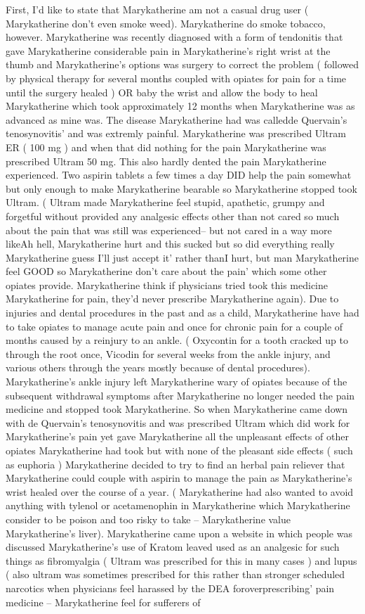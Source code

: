 \documentclass[12pt]{book}
\begin{document}
First, I'd like to state that Marykatherine am not a casual drug user ( Marykatherine don't even smoke weed). Marykatherine do smoke tobacco, however. Marykatherine was recently diagnosed with a form of tendonitis that gave Marykatherine considerable pain in Marykatherine's right wrist at the thumb and Marykatherine's options was surgery to correct the problem ( followed by physical therapy for several months coupled with opiates for pain for a time until the surgery healed ) OR baby the wrist and allow the body to heal Marykatherine which took approximately 12 months when Marykatherine was as advanced as mine was. The disease Marykatherine had was calledde Quervain's tenosynovitis' and was extremly painful. Marykatherine was prescribed Ultram ER ( 100 mg ) and when that did nothing for the pain Marykatherine was prescribed Ultram 50 mg. This also hardly dented the pain Marykatherine experienced. Two aspirin tablets a few times a day DID help the pain somewhat but only enough to make Marykatherine bearable so Marykatherine stopped took Ultram. ( Ultram made Marykatherine feel stupid, apathetic, grumpy and forgetful without provided any analgesic effects other than not cared so much about the pain that was still was experienced-- but not cared in a way more likeAh hell, Marykatherine hurt and this sucked but so did everything really Marykatherine guess I'll just accept it' rather thanI hurt, but man Marykatherine feel GOOD so Marykatherine don't care about the pain' which some other opiates provide. Marykatherine think if physicians tried took this medicine Marykatherine for pain, they'd never prescribe Marykatherine again). Due to injuries and dental procedures in the past and as a child, Marykatherine have had to take opiates to manage acute pain and once for chronic pain for a couple of months caused by a reinjury to an ankle. ( Oxycontin for a tooth cracked up to through the root once, Vicodin for several weeks from the ankle injury, and various others through the years mostly because of dental procedures). Marykatherine's ankle injury left Marykatherine wary of opiates because of the subsequent withdrawal symptoms after Marykatherine no longer needed the pain medicine and stopped took Marykatherine. So when Marykatherine came down with de Quervain's tenosynovitis and was prescribed Ultram which did work for Marykatherine's pain yet gave Marykatherine all the unpleasant effects of other opiates Marykatherine had took but with none of the pleasant side effects ( such as euphoria ) Marykatherine decided to try to find an herbal pain reliever that Marykatherine could couple with aspirin to manage the pain as Marykatherine's wrist healed over the course of a year. ( Marykatherine had also wanted to avoid anything with tylenol or acetamenophin in Marykatherine which Marykatherine consider to be poison and too risky to take -- Marykatherine value Marykatherine's liver). Marykatherine came upon a website in which people was discussed Marykatherine's use of Kratom leaved used as an analgesic for such things as fibromyalgia ( Ultram was prescribed for this in many cases ) and lupus ( also ultram was sometimes prescribed for this rather than stronger scheduled narcotics when physicians feel harassed by the DEA foroverprescribing' pain medicine -- Marykatherine feel for sufferers of 
\end{document}
